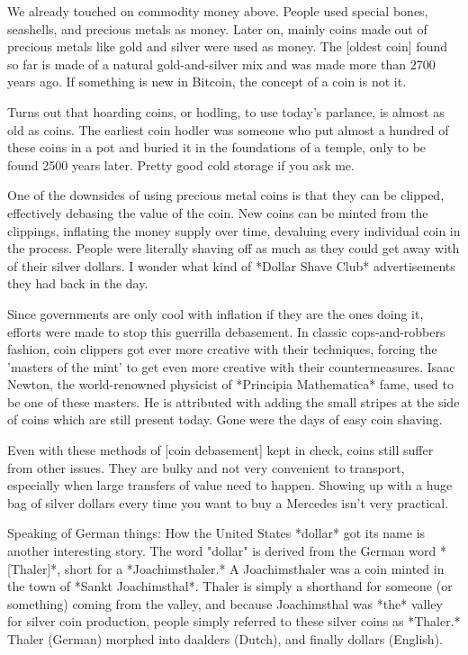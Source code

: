 We already touched on commodity money above. People used special bones,
seashells, and precious metals as money. Later on, mainly coins made out
of precious metals like gold and silver were used as money. The [oldest
coin] found so far is made of a natural gold-and-silver mix and was made
more than 2700 years ago. If something is new in Bitcoin, the concept of
a coin is not it.


Turns out that hoarding coins, or hodling, to use today's parlance, is
almost as old as coins. The earliest coin hodler was someone who put
almost a hundred of these coins in a pot and buried it in the
foundations of a temple, only to be found 2500 years later. Pretty good
cold storage if you ask me.

One of the downsides of using precious metal coins is that they can be
clipped, effectively debasing the value of the coin. New coins can be
minted from the clippings, inflating the money supply over time,
devaluing every individual coin in the process. People were literally
shaving off as much as they could get away with of their silver dollars.
I wonder what kind of *Dollar Shave Club* advertisements they had back
in the day.

Since governments are only cool with inflation if they are the ones
doing it, efforts were made to stop this guerrilla debasement. In
classic cops-and-robbers fashion, coin clippers got ever more creative
with their techniques, forcing the 'masters of the mint' to get even
more creative with their countermeasures. Isaac Newton, the
world-renowned physicist of *Principia Mathematica* fame, used to be one
of these masters. He is attributed with adding the small stripes at the
side of coins which are still present today. Gone were the days of easy
coin shaving.


Even with these methods of [coin debasement] kept in check, coins still
suffer from other issues. They are bulky and not very convenient to
transport, especially when large transfers of value need to happen.
Showing up with a huge bag of silver dollars every time you want to buy
a Mercedes isn't very practical.

Speaking of German things: How the United States *dollar* got its name
is another interesting story. The word "dollar" is derived from the
German word *[Thaler]*, short for a *Joachimsthaler.* A Joachimsthaler
was a coin minted in the town of *Sankt Joachimsthal*. Thaler is simply
a shorthand for someone (or something) coming from the valley, and
because Joachimsthal was *the* valley for silver coin production, people
simply referred to these silver coins as *Thaler.* Thaler (German)
morphed into daalders (Dutch), and finally dollars (English).

